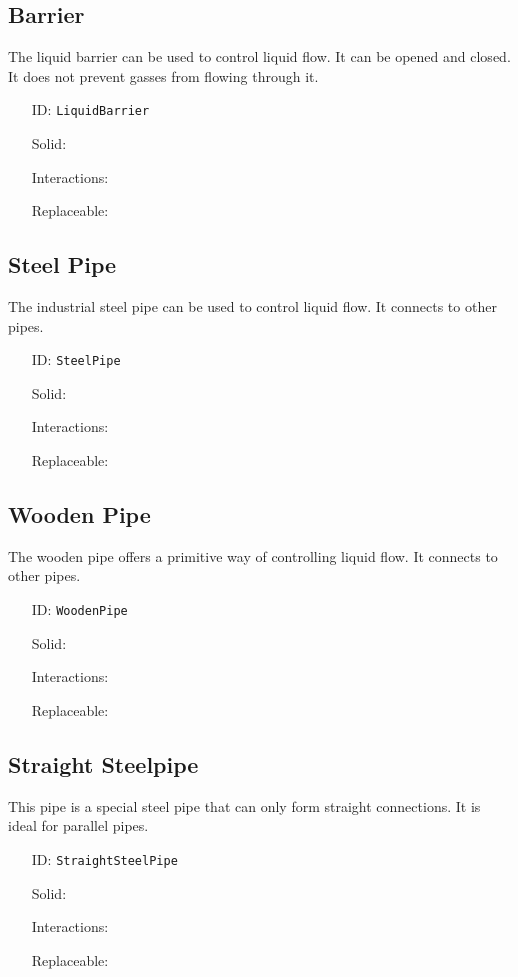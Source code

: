 \subsection{Barrier}\label{subsec:blocks_barrier}
The liquid barrier can be used to control liquid flow. It can be opened and closed.
It does not prevent gasses from flowing through it.
\newline
\begin{itemize}[nosep]
    \item[ID:] \texttt{LiquidBarrier}
    \item[Solid:]  \Checkmark \item[Interactions:]  \Checkmark \item[Replaceable:]  \XSolidBrush
\end{itemize}

\subsection{Steel Pipe}\label{subsec:blocks_steel pipe}
The industrial steel pipe can be used to control liquid flow.
It connects to other pipes.
\newline
\begin{itemize}[nosep]
    \item[ID:] \texttt{SteelPipe}
    \item[Solid:]  \Checkmark \item[Interactions:]  \XSolidBrush \item[Replaceable:]  \XSolidBrush
\end{itemize}

\subsection{Wooden Pipe}\label{subsec:blocks_wooden pipe}
The wooden pipe offers a primitive way of controlling liquid flow.
It connects to other pipes.
\newline
\begin{itemize}[nosep]
    \item[ID:] \texttt{WoodenPipe}
    \item[Solid:]  \Checkmark \item[Interactions:]  \XSolidBrush \item[Replaceable:]  \XSolidBrush
\end{itemize}

\subsection{Straight Steelpipe}\label{subsec:blocks_straight steelpipe}
This pipe is a special steel pipe that can only form straight connections.
It is ideal for parallel pipes.
\newline
\begin{itemize}[nosep]
    \item[ID:] \texttt{StraightSteelPipe}
    \item[Solid:]  \Checkmark \item[Interactions:]  \XSolidBrush \item[Replaceable:]  \XSolidBrush
\end{itemize}

